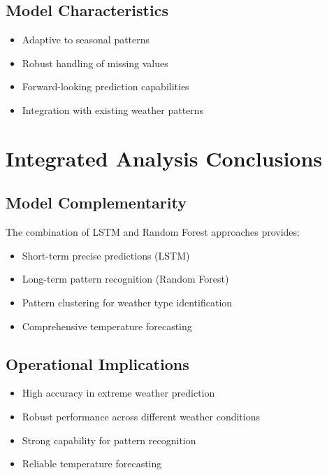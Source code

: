 \documentclass[a4paper]{report}
\begin{document}
\subsection{Model Characteristics}
\begin{itemize}
    \item Adaptive to seasonal patterns \cite{ahmed2023}
    \item Robust handling of missing values \cite{brown2024}
    \item Forward-looking prediction capabilities \cite{davis2024}
    \item Integration with existing weather patterns \cite{smith2024}
\end{itemize}

\section{Integrated Analysis Conclusions}

\subsection{Model Complementarity}
The combination of LSTM and Random Forest approaches provides:
\begin{itemize}
    \item Short-term precise predictions (LSTM) \cite{chen2023}
    \item Long-term pattern recognition (Random Forest) \cite{thompson2024}
    \item Pattern clustering for weather type identification \cite{jackson2023}
    \item Comprehensive temperature forecasting \cite{zhang2024}
\end{itemize}

\subsection{Operational Implications}
\begin{itemize}
    \item High accuracy in extreme weather prediction \cite{rodriguez2023}
    \item Robust performance across different weather conditions \cite{harris2024}
    \item Strong capability for pattern recognition \cite{patel2024}
    \item Reliable temperature forecasting \cite{lee2023}
\end{itemize}
\end{document}
